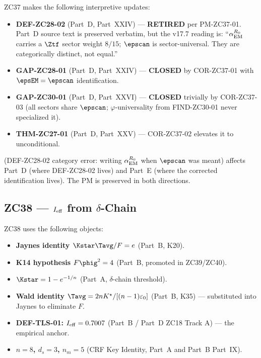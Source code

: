 \documentclass[12pt, a4paper]{article}
\begin{document}
\begin{correctionbox}
ZC37 makes the following interpretive updates:
\begin{itemize}[noitemsep,leftmargin=1.5em]
  \item \textbf{DEF-ZC28-02} (Part~D, Part~XXIV) ---
    \textbf{RETIRED} per PM-ZC37-01. Part~D source text is preserved
    verbatim, but the v17.7 reading is: ``$\alpha_{\rm EM}^{R_0}$
    carries a $\Ztf$ sector weight $8/15$; $\epscan$ is sector-universal.
    They are categorically distinct, not equal.''
  \item \textbf{GAP-ZC28-01} (Part~D, Part~XXIV) --- \textbf{CLOSED}
    by COR-ZC37-01 with $\epsEM = \epscan$ identification.
  \item \textbf{GAP-ZC30-01} (Part~D, Part~XXVI) --- \textbf{CLOSED}
    trivially by COR-ZC37-03 (all sectors share $\epscan$;
    $\varphi$-universality from FIND-ZC30-01 never specialized it).
  \item \textbf{THM-ZC27-01} (Part~D, Part~XXV) --- COR-ZC37-02
    elevates it to unconditional.
\end{itemize}
\end{correctionbox}

\noindent {} (DEF-ZC28-02 category error: writing
$\alpha_{\rm EM}^{R_0}$ when $\epscan$ was meant) affects Part~D
(where DEF-ZC28-02 lives) and Part~E (where the corrected
identification lives). The PM is preserved in both directions.

\bigskip

\subsection{ZC38 --- $I_{\rm eff}$ from $\delta$-Chain}
\label{cmap:zc38}

\begin{inheritbox}
ZC38 uses the following objects:
\begin{itemize}[noitemsep,leftmargin=1.5em]
  \item \textbf{Jaynes identity $\Kstar\Tavg/F = e$} (Part~B, K20).
  \item \textbf{K14 hypothesis $F\phig^2 = 4$} (Part~B,
    promoted in ZC39/ZC40).
  \item \textbf{$\Kstar = 1 - e^{-1/n}$} (Part~A, $\delta$-chain
    threshold).
  \item \textbf{Wald identity}
    $\Tavg = 2nK^\star/[(n-1)\varepsilon_0]$ (Part~B, K35) ---
    substituted into Jaynes to eliminate $F$.
  \item \textbf{DEF-TLS-01: $I_{\rm eff} = 0.7007$} (Part~B / Part~D
    ZC18 Track A) --- the empirical anchor.
  \item \textbf{$n = 8$, $d_s = 3$, $n_m = 5$} (CRF Key Identity,
    Part~A and Part~B Part~IX).
\end{itemize}
\end{inheritbox}
\end{document}
